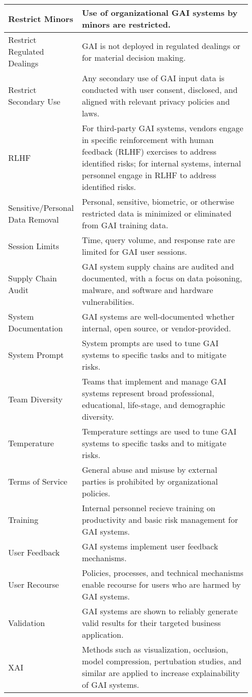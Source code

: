 \documentclass[fleqn]{article}
\begin{document}
\begin{table}[H]
\begin{tabular}{|m{0.25\linewidth} |m{0.70\linewidth} |}
		Restrict Minors & Use of organizational GAI systems by minors are restricted.  \\ \hline
		Restrict Regulated Dealings & GAI is not deployed in regulated dealings or for material decision making.  \\ \hline			
		Restrict Secondary Use & Any secondary use of GAI input data is conducted with user consent, disclosed, and aligned with relevant privacy policies and laws. \\ \hline	
		RLHF & For third-party GAI systems, vendors engage in specific reinforcement with human feedback (RLHF) exercises to address identified risks; for internal systems, internal personnel engage in RLHF to address identified risks.   \\ \hline
		Sensitive/Personal Data Removal & Personal, sensitive, biometric, or otherwise restricted data is minimized or eliminated from GAI training data.  \\ \hline
		Session Limits & Time, query volume, and response rate are limited for GAI user sessions. \\ \hline
		Supply Chain Audit & GAI system supply chains are audited and documented, with a focus on data poisoning, malware, and software and hardware vulnerabilities.   \\ \hline
		System Documentation & GAI systems are well-documented whether internal, open source, or vendor-provided.  \\ \hline
		System Prompt  & System prompts are used to tune GAI systems to specific tasks and to mitigate risks.  \\ \hline
		Team Diversity & Teams that implement and manage GAI systems represent broad professional, educational, life-stage, and demographic diversity.  \\ \hline
		Temperature & Temperature settings are used to tune GAI systems to specific tasks and to mitigate risks.  \\ \hline
		Terms of Service & General abuse and misuse by external parties is prohibited by organizational policies.  \\ \hline
		Training  & Internal personnel recieve training on productivity and basic risk management for GAI systems.  \\ \hline
		User Feedback & GAI systems implement user feedback mechanisms.   \\ \hline
		User Recourse & Policies, processes, and technical mechanisms enable recourse for users who are harmed by GAI systems.  \\ \hline
		Validation & GAI systems are shown to reliably generate valid results for their targeted business application. \\ \hline
		XAI & Methods such as visualization, occlusion, model compression, pertubation studies, and similar are applied to increase explainability of GAI systems.  \\ \hline
	\end{tabular}
\end{table}
\end{document}
